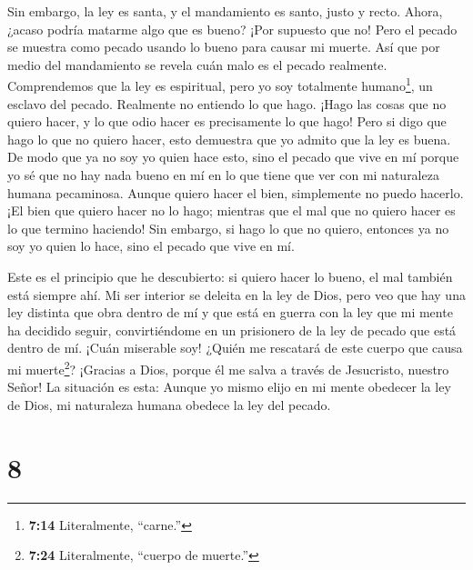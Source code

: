  Sin embargo, la ley es santa, y el mandamiento es santo,
justo y recto.  Ahora, ¿acaso podría matarme algo que es
bueno? ¡Por supuesto que no! Pero el pecado se muestra como pecado
usando lo bueno para causar mi muerte. Así que por medio del mandamiento
se revela cuán malo es el pecado realmente.  Comprendemos
que la ley es espiritual, pero yo soy totalmente humano\footnote{\textbf{7:14}
  Literalmente, ``carne.''}, un esclavo del pecado. 
Realmente no entiendo lo que hago. ¡Hago las cosas que no quiero hacer,
y lo que odio hacer es precisamente lo que hago!  Pero si
digo que hago lo que no quiero hacer, esto demuestra que yo admito que
la ley es buena.  De modo que ya no soy yo quien hace esto,
sino el pecado que vive en mí  porque yo sé que no hay nada
bueno en mí en lo que tiene que ver con mi naturaleza humana pecaminosa.
Aunque quiero hacer el bien, simplemente no puedo hacerlo. 
¡El bien que quiero hacer no lo hago; mientras que el mal que no quiero
hacer es lo que termino haciendo!  Sin embargo, si hago lo
que no quiero, entonces ya no soy yo quien lo hace, sino el pecado que
vive en mí.

 Este es el principio que he descubierto: si quiero hacer
lo bueno, el mal también está siempre ahí.  Mi ser interior
se deleita en la ley de Dios,  pero veo que hay una ley
distinta que obra dentro de mí y que está en guerra con la ley que mi
mente ha decidido seguir, convirtiéndome en un prisionero de la ley de
pecado que está dentro de mí.  ¡Cuán miserable soy! ¿Quién
me rescatará de este cuerpo que causa mi muerte\footnote{\textbf{7:24}
  Literalmente, ``cuerpo de muerte.''}? ¡Gracias a Dios, porque él me
salva a través de Jesucristo, nuestro Señor!  La situación
es esta: Aunque yo mismo elijo en mi mente obedecer la ley de Dios, mi
naturaleza humana obedece la ley del pecado.

\hypertarget{section-7}{%
\section{8}\label{section-7}}

